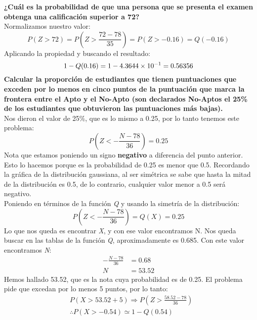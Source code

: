 \documentclass[
	12pt, %
	fleqn, %
	a4paper, %
	oneside, %
]{LegrandOrangeBook}
\begin{document}
\begin{example}
\textbf{¿Cuál es la probabilidad de que una persona que se presenta el examen obtenga una calificación superior a 72?}\\
Normalizamos nuestro valor:
\begin{displaymath}
P(Z>72)=P\left(Z>\frac{72-78}{35}\right)=P(Z>-0.16)=Q(-0.16)
\end{displaymath}
Aplicando la propiedad y buscando el resultado:
\begin{displaymath}
1-Q(0.16)=1-4.3644\times 10^{-1}=0.56356
\end{displaymath}
\textbf{Calcular la proporción de estudiantes que tienen puntuaciones que exceden por lo menos en cinco puntos de la puntuación que marca la frontera entre el Apto y el No-Apto (son declarados No-Aptos el 25\% de los estudiantes que obtuvieron las puntuaciones más bajas).}\\
Nos dieron el valor de 25\%, que es lo mismo a 0.25,  por lo tanto tenemos este problema:
\begin{displaymath}
P\left(Z<-\frac{N-78}{36}\right)=0.25
\end{displaymath}
Nota que estamos poniendo un signo \textbf{negativo} a diferencia del punto anterior. Esto lo hacemos porque es la probabilidad de 0.25 es menor que 0.5. Recordando la gráfica de la distribución gaussiana, al ser simétrica se sabe que hasta la mitad de la distribución es 0.5, de lo contrario, cualquier valor menor a 0.5 será negativo.\\
Poniendo en términos de la función \textit{Q} y usando la simetría de la distribución:
\begin{displaymath}
P\left(Z<-\frac{N-78}{36}\right)=Q(X)=0.25
\end{displaymath}
Lo que nos queda es encontrar \textit{X}, y con ese valor encontramos N. Nos queda buscar en las tablas de la función \textit{Q}, aproximadamente es 0.685. Con este valor encontramos \textit{N}:
\begin{align*}
-\frac{N-78}{36}&=0.68\\
N&=53.52
\end{align*}
Hemos hallado 53.52, que es la nota cuya probabilidad es de 0.25. El problema pide que excedan por lo menos 5 puntos, por lo tanto:
\begin{align*}
&P(X>53.52+5)\Rightarrow P(Z>\frac{58.52-78}{36})\\
&\therefore P(X>-0.54)\simeq 1-Q(0.54)\\

\end{align*}
\end{example}
\end{document}
